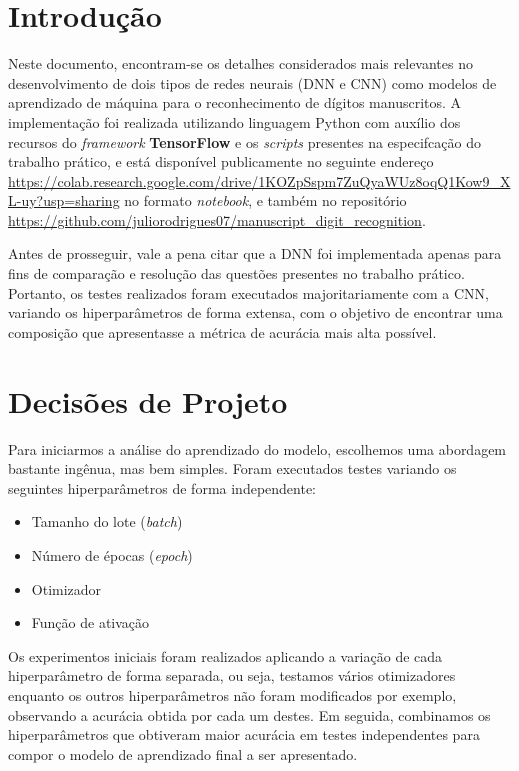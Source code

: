 \documentclass[a4paper, 12pt]{article}
\begin{document}
\tableofcontents
\newpage

\section{Introdução}

Neste documento, encontram-se os detalhes considerados mais relevantes no desenvolvimento de dois tipos de redes neurais (DNN e CNN) como modelos de aprendizado de máquina para o reconhecimento de dígitos manuscritos. A implementação foi realizada utilizando linguagem Python com auxílio dos recursos do \emph{framework} \textbf{TensorFlow} e os \emph{scripts} presentes na especifcação do trabalho prático, e está disponível publicamente no seguinte endereço \url{https://colab.research.google.com/drive/1KOZpSspm7ZuQyaWUz8oqQ1Kow9_XL-uy?usp=sharing} no formato \emph{notebook}, e também no repositório \url{https://github.com/juliorodrigues07/manuscript_digit_recognition}.

Antes de prosseguir, vale a pena citar que a DNN foi implementada apenas para fins de comparação e resolução das questões presentes no trabalho prático. Portanto, os testes realizados foram executados majoritariamente com a CNN, variando os hiperparâmetros de forma extensa, com o objetivo de encontrar uma composição que apresentasse a métrica de acurácia mais alta possível.
    
\section{Decisões de Projeto}

Para iniciarmos a análise do aprendizado do modelo, escolhemos uma abordagem bastante ingênua, mas bem simples. Foram executados testes variando os seguintes hiperparâmetros de forma independente:

\begin{itemize}
    \item Tamanho do lote (\emph{batch})
    \item Número de épocas (\emph{epoch})
    \item Otimizador
    \item Função de ativação
\end{itemize}

Os experimentos iniciais foram realizados aplicando a variação de cada hiperparâmetro de forma separada, ou seja, testamos vários otimizadores enquanto os outros hiperparâmetros não foram modificados por exemplo, observando a acurácia obtida por cada um destes. Em seguida, combinamos os hiperparâmetros que obtiveram maior acurácia em testes independentes para compor o modelo de aprendizado final a ser apresentado.
\end{document}
